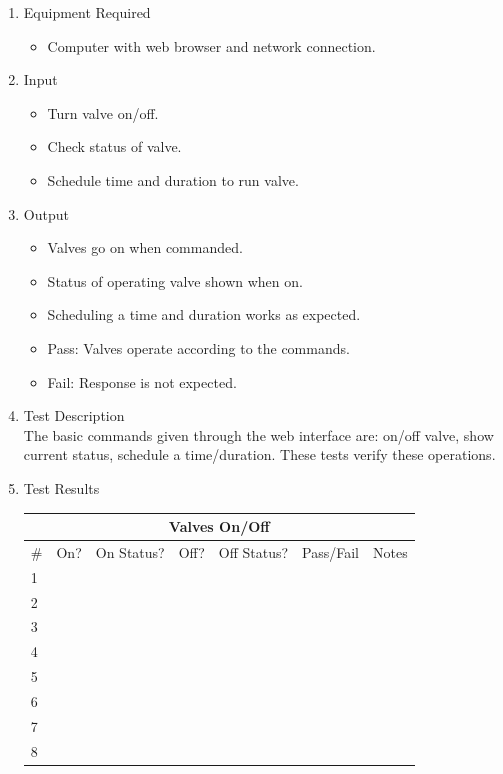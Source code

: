 \documentclass{article}
\begin{document}
\begin{enumerate}
\item Equipment Required
	\begin{itemize}
	\item Computer with web browser and network connection.
	\end{itemize}
\item Input
	\begin{itemize}
	\item Turn valve on/off.
	\item Check status of valve.
	\item Schedule time and duration to run valve.
	\end{itemize}
\item Output
	\begin{itemize}
	\item Valves go on when commanded.
	\item Status of operating valve shown when on.
	\item Scheduling a time and duration works as expected.
	\item Pass: Valves operate according to the commands.
	\item Fail: Response is not expected.
	\end{itemize}
\item Test Description \\

The basic commands given through the web interface are:
on/off valve, show current status, schedule a time/duration.
These tests verify these operations.

\item Test Results \\
	\vspace{0.25in}
	\begin{tabular}{|l|l|l|l|l|l|c|}
		\hline
		\multicolumn{7}{|c|}{Valves On/Off} \\
		\hline
		\# & On? & On Status? & Off? & Off Status? & Pass/Fail & \hspace{0.7in}Notes\hspace{0.7in} \\
		\hline
		1 &&&&&& \\
		\hline
		2 &&&&&& \\
		\hline
		3 &&&&&& \\
		\hline
		4 &&&&&& \\
		\hline
		5 &&&&&& \\
		\hline
		6 &&&&&& \\
		\hline
		7 &&&&&& \\
		\hline
		8 &&&&&& \\
		\hline
	\end{tabular}


\end{enumerate}
\end{document}
